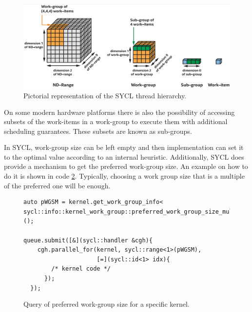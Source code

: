 \begin{figure}[ht!]
    \centering
    \includegraphics[width=\textwidth]{media/sycl_nd_range.png}
    \caption{Pictorial representation of the SYCL thread hierarchy.}
    \label{fig:sycl_nd_range}
\end{figure}

On some modern hardware platforms there is also the possibility of accessing subsets of the work-items in a
work-group to execute them with additional scheduling guarantees. These subsets are known as sub-groups. 

In SYCL, work-group size can be left empty and then implementation can set it to the optimal value according to an internal heuristic. Additionally, SYCL does provide a mechanism to get the preferred work-group size. An example on how to do it is shown in code \ref{code:work_group_size}. Typically, choosing a work group size that is a multiple of the preferred one will be enough.

\begin{figure}[ht!]
\renewcommand{\figurename}{Code}
\begin{verbatim}
auto pWGSM = kernel.get_work_group_info<
sycl::info::kernel_work_group::preferred_work_group_size_multiple>();

queue.submit([&](sycl::handler &cgh){
    cgh.parallel_for(kernel, sycl::range<1>(pWGSM), 
                     [=](sycl::id<1> idx){
        /* kernel code */
      });
  });
\end{verbatim}
\caption{Query of preferred work-group size for a specific kernel.}
\label{code:work_group_size}
\end{figure}

